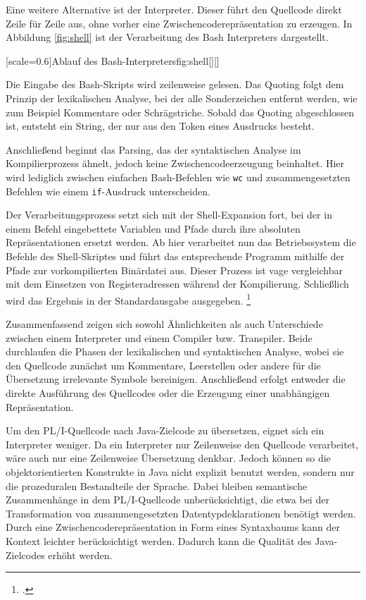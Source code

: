 Eine weitere Alternative ist der Interpreter. Dieser führt den Quellcode direkt Zeile für Zeile aus, ohne vorher eine Zwischencoderepräsentation zu erzeugen. In Abbildung \ref{fig:shell} ist der Verarbeitung des Bash Interpreters dargestellt.


[scale=0.6]{Ablauf des Bash-Interpreters}{fig:shell}[][]
\pagebreak

Die Eingabe des Bash-Skripts wird zeilenweise gelesen.
Das Quoting folgt dem Prinzip der lexikalischen Analyse, bei der alle Sonderzeichen entfernt werden, wie zum Beispiel Kommentare oder Schrägstriche. Sobald das Quoting abgeschlossen ist, entsteht ein String, der nur aus den Token eines Ausdrucks besteht.

Anschließend beginnt das Parsing, das der syntaktischen Analyse im Kompilierprozess ähnelt, jedoch keine Zwischencodeerzeugung beinhaltet. Hier wird lediglich zwischen einfachen Bash-Befehlen wie \verb+wc+ und zusammengesetzten Befehlen wie einem \verb+if+-Ausdruck unterscheiden.

Der Verarbeitungsprozess setzt sich mit der Shell-Expansion fort, bei der in einem Befehl eingebettete Variablen und Pfade durch ihre absoluten Repräsentationen ersetzt werden.
Ab hier verarbeitet nun das Betriebssystem die Befehle des Shell-Skriptes und führt das entsprechende Programm mithilfe der Pfade zur vorkompilierten Binärdatei aus. Dieser Prozess ist vage vergleichbar mit dem Einsetzen von Registeradressen während der Kompilierung.
Schließlich wird das Ergebnis in der Standardausgabe ausgegeben. \footcite[Vgl. ][]{gnubash}


Zusammenfassend zeigen sich sowohl Ähnlichkeiten als auch Unterschiede zwischen einem Interpreter und einem Compiler bzw. Transpiler. Beide durchlaufen die Phasen der lexikalischen und syntaktischen Analyse, wobei sie den Quellcode zunächst um Kommentare, Leerstellen oder andere für die Übersetzung irrelevante Symbole bereinigen. Anschließend erfolgt entweder die direkte Ausführung des Quellcodes oder die Erzeugung einer unabhängigen Repräsentation.

Um den PL/I-Quellcode nach Java-Zielcode zu übersetzen, eignet sich ein Interpreter weniger. Da ein Interpreter nur Zeilenweise den Quellcode verarbeitet, wäre auch nur eine Zeilenweise Übersetzung denkbar. 
Jedoch können so die objektorientierten Konstrukte in Java nicht explizit benutzt werden, sondern nur die prozeduralen Bestandteile der Sprache. Dabei bleiben semantische Zusammenhänge in dem PL/I-Quellcode unberücksichtigt, die etwa bei der Transformation von zusammengesetzten Datentypdeklarationen benötigt werden. 
Durch eine Zwischencoderepräsentation in Form eines Syntaxbaums kann der Kontext leichter berücksichtigt werden. Dadurch kann die Qualität des Java-Zielcodes erhöht werden.

